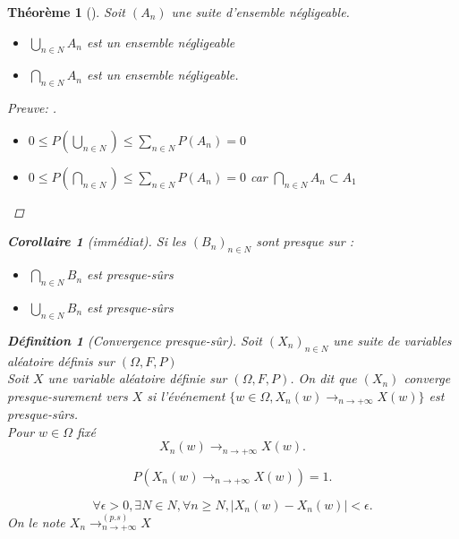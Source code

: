 \documentclass{article}
\theoremstyle{plain}%
\newtheorem{thm}{Théorème}[section]
\newtheorem*{cor}{Corollaire}
\theoremstyle{definition}
\newtheorem{defn}{Définition}[section]
\theoremstyle{remark}
\begin{document}
\begin{thm}[]
    Soit $ (A_n) $ une suite d'ensemble négligeable.
    \begin{itemize}
        \item $\bigcup_{n \in N}^{}A_n$ est un ensemble négligeable
        \item $\bigcap_{n \in N}^{}A_n$ est un ensemble négligeable.
    \end{itemize}
    \begin{proof}[Preuve: ]
        \begin{itemize}
            \item $ 0 \leq P(\bigcup_{n \in N}^{}) \leq \sum_{n \in N}^{} P(A_n) = 0 $ 
            \item $ 0 \leq P(\bigcap_{n \in N}^{}) \leq \sum_{n \in N}^{} P(A_n) = 0 $ car $ \bigcap_{n \in N}^{}A_n \subset A_1 $ 
        \end{itemize}
    \end{proof}
    \begin{cor}[immédiat]
        Si les $ (B_n)_{n \in N} $ sont presque sur : \begin{itemize}
            \item $ \bigcap_{n \in N}^{} B_n $ est presque-sûrs
            \item $ \bigcup_{n \in N}^{} B_n $ est presque-sûrs 
        \end{itemize}
    \end{cor}
    
    \begin{defn}[Convergence presque-sûr]
        Soit $ (X_n)_{n \in N} $ une suite de variables aléatoire définis sur $ (\Omega , F, P) $ \\
        Soit $ X $ une variable aléatoire définie sur $ (\Omega , F, P) $.
        On dit que $ (X_n) $ converge presque-surement vers $ X $ si l'événement $ \{w \in \Omega, X_n(w) \to_{n \to + \infty } X(w)\} $ est presque-sûrs. \\
        Pour $ w \in \Omega  $ fixé 
        \[
            X_n(w) \to_{n \to + \infty } X(w)
        .\]
        
        
        \[
            P(X_n(w) \to_{n \to + \infty } X(w)) = 1
        .\]
        
        \[
            \forall \epsilon > 0, \exists N \in N, \forall n \geq N, \left| X_n(w)-X_n(w) \right| < \epsilon 
        .\]
        On le note $ X_n \to_{n \to + \infty }^(p.s) X $ 
    \end{defn}


\end{thm}
\end{document}
